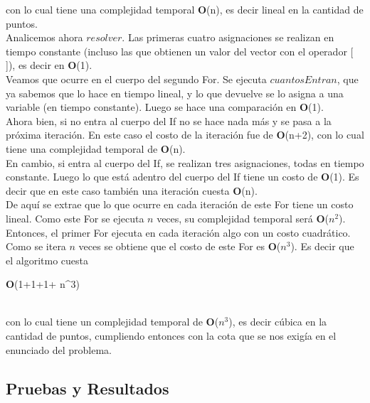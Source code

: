 con lo cual tiene una complejidad temporal \textbf{O}(n), es decir lineal en la cantidad de puntos.\\


\indent Analicemos ahora $resolver$. Las primeras cuatro asignaciones se realizan en tiempo constante (incluso las que obtienen un valor del vector con el operador [ ]), es decir en \textbf{O}(1).\\
\indent Veamos que ocurre en el cuerpo del segundo For. Se ejecuta $cuantosEntran$, que ya sabemos que lo hace en tiempo lineal, y lo que devuelve se lo asigna a una variable (en tiempo constante). Luego se hace una comparaci\'on en \textbf{O}(1).\\
\indent Ahora bien, si no entra al cuerpo del If no se hace nada más y se pasa a la pr\'oxima iteraci\'on. En este caso el costo de la iteración fue de \textbf{O}(n+2), con lo cual tiene una complejidad temporal de \textbf{O}(n).\\
\indent En cambio, si entra al cuerpo del If, se realizan tres asignaciones, todas en tiempo constante. Luego lo que está adentro del cuerpo del If tiene un costo de \textbf{O}(1). Es decir que en este caso también una iteraci\'on cuesta \textbf{O}(n).\\
\indent De aqu\'i se extrae que lo que ocurre en cada iteraci\'on de este For tiene un costo lineal. Como este For se ejecuta $n$ veces, su complejidad temporal será \textbf{O}($n^2$).\\
\indent Entonces, el primer For ejecuta en cada iteración algo con un costo cuadrático. Como se itera $n$ veces se obtiene que el costo de este For es \textbf{O}($n^3$). Es decir que el algoritmo cuesta \\
\begin{center}
\textbf{O}(1+1+1+ n^3)
\end{center}\\

con lo cual tiene un complejidad temporal de \textbf{O}($n^3$), es decir c\'ubica en la cantidad de puntos, cumpliendo entonces con la cota que se nos exigía en el enunciado del problema.\\


\subsection{Pruebas y Resultados}


